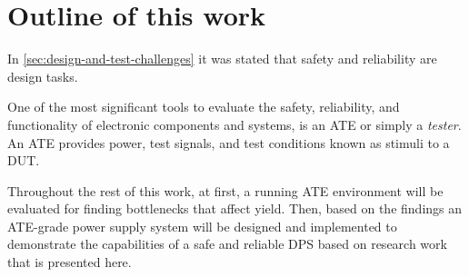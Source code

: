 

\pagebreak
\section{Outline of this work}
\label{sec:work-outline}

In \autoref{sec:design-and-test-challenges} it was stated that safety
and reliability are design tasks.

One of the most significant tools to evaluate the safety,
reliability, and functionality of electronic components and systems,
is an \ac{ATE} or simply a \emph{tester}.
An \ac{ATE} provides power, test signals, and test conditions known as
stimuli to a \ac{DUT}.

Throughout the rest of this work, at first, a running \ac{ATE} environment will be
evaluated for finding bottlenecks that affect yield.
Then, based on the findings an \ac{ATE}-grade power supply system will be
designed and implemented to demonstrate the capabilities of a safe and
reliable \ac{DPS} based on research work that is presented here.


